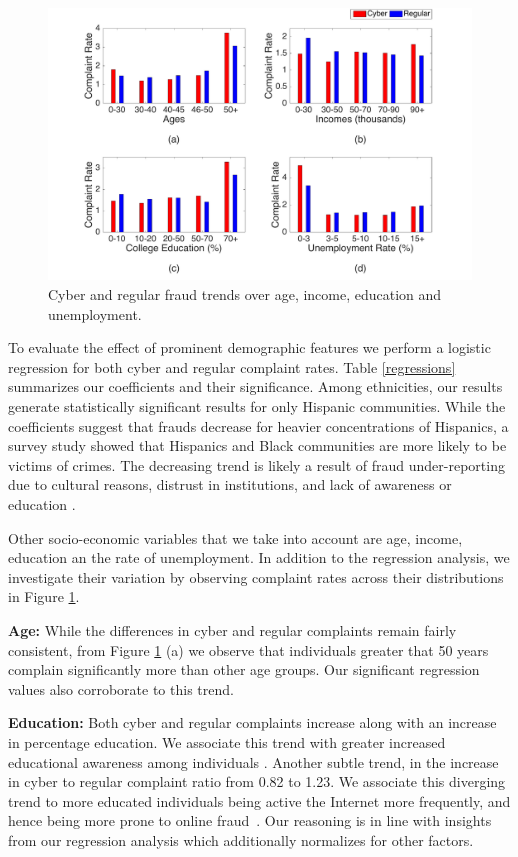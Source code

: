 \documentclass[conference]{IEEEtran}
\begin{document}
\begin{figure}[b]
\centering
  \includegraphics[scale=0.29]{graphics/demographics.pdf}
  \caption{Cyber and regular fraud trends over age, income, education and unemployment.}
  \label{demographics}
\end{figure}
To evaluate the effect of prominent demographic features we perform a logistic regression for both cyber and regular complaint rates. Table \ref{regressions} summarizes our coefficients and their significance. Among ethnicities, our results generate statistically significant results for only Hispanic communities. While the coefficients suggest that frauds decrease for heavier concentrations of  Hispanics, a survey study \cite{anderson2013consumer} showed that Hispanics and Black communities are more likely to be victims of crimes. The decreasing trend is likely a result of fraud under-reporting due to cultural reasons, distrust in institutions, and lack of awareness or education \cite{consumerlessons}.

Other socio-economic variables that we take into account are age, income, education an the rate of unemployment. In addition to the regression analysis, we investigate their variation by observing complaint rates across their distributions in Figure \ref{demographics}.

\textbf{Age:} While the differences in cyber and regular complaints remain fairly consistent, from Figure \ref{demographics} (a) we observe that individuals greater that 50 years complain significantly more than other age groups. Our significant regression values also corroborate to this trend. 


\textbf{Education:} Both cyber and regular complaints increase along with an increase in percentage education. We associate this trend with greater increased educational awareness among individuals \cite{consumerlessons}. Another subtle trend, in the increase in cyber to regular complaint ratio from 0.82 to 1.23. We associate this diverging trend to more educated individuals being active  the Internet  more frequently, and hence being more prone to online fraud~\cite{pewcollege}. Our reasoning is in line with insights from our regression analysis which additionally normalizes for other factors.
\end{document}
